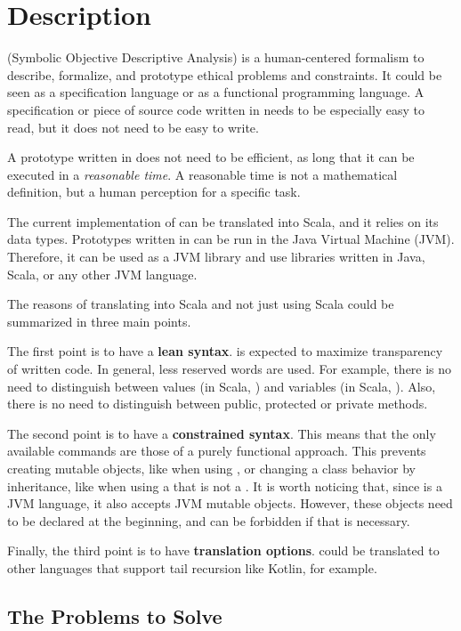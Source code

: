 \chapter{Description}

\Soda (Symbolic Objective Descriptive Analysis) is a human-centered formalism to describe, formalize, and prototype ethical problems and constraints.
It could be seen as a specification language or as a functional programming language.
A specification or piece of source code written in \Soda needs to be especially easy to read, but it does not need to be easy to write.

A prototype written in \Soda does not need to be efficient, as long that it can be executed in a \textit{reasonable time}.
A reasonable time is not a mathematical definition, but a human perception for a specific task.

The current implementation of \Soda can be translated into Scala, and it relies on its data types.
Prototypes written in \Soda can be run in the Java Virtual Machine (JVM).
Therefore, it can be used as a JVM library and use libraries written in Java, Scala, or any other JVM language.

The reasons of translating \Soda into Scala and not just using Scala could be summarized in three main points.

The first point is to have a \textbf{lean syntax}.
\Soda is expected to maximize transparency of written code.
In general, less reserved words are used.
For example, there is no need to distinguish between values (in Scala, \scalaval) and variables (in Scala, \scalavar).
Also, there is no need to distinguish between public, protected or private methods.

The second point is to have a \textbf{constrained syntax}.
This means that the only available commands are those of a purely functional approach.
This prevents creating mutable objects, like when using \scalavar, or changing a class behavior by inheritance, like when using a \scalaclass that is not a \scalacase \scalaclass.
It is worth noticing that, since \Soda is a JVM language, it also accepts JVM mutable objects.
However, these objects need to be declared at the beginning, and can be forbidden if that is necessary.

Finally, the third point is to have \textbf{translation options}.
\Soda could be translated to other languages that support tail recursion like Kotlin, for example.


\section{The Problems to Solve}

